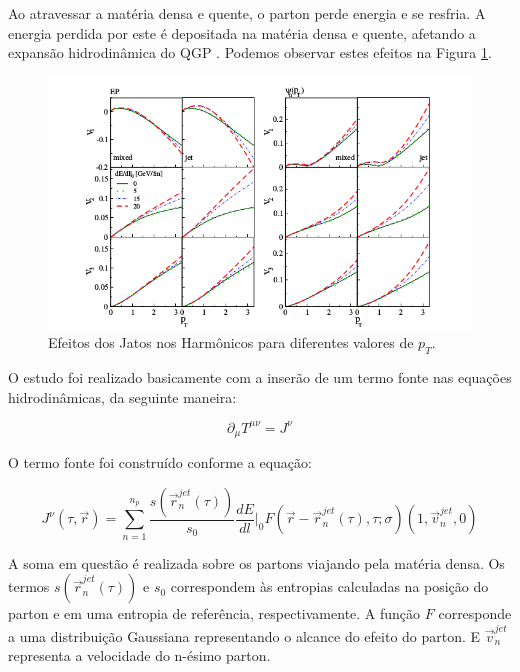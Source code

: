Ao atravessar a matéria densa e quente, o parton perde energia e se resfria. A energia perdida
por este é depositada na matéria densa e quente, afetando a expansão hidrodinâmica do QGP
\cite{andrade_jet_2014}. Podemos observar estes efeitos na Figura \ref{fig:v2}.

\begin{figure}[!htb]
\centering
 \includegraphics[scale=0.4]{Content/v2.png}
 \caption{Efeitos dos Jatos nos Harmônicos para diferentes valores de $p_{T}$.}
 \label{fig:v2}
\end{figure}

O estudo foi realizado basicamente com a inserão de um termo fonte nas equações hidrodinâmicas, da seguinte maneira:

\begin{equation}
 \partial_{\mu} T^{\mu \nu} = J^{\nu}
\end{equation}

O termo fonte foi construído conforme a equação:

\begin{equation}
 J^{\nu}(\tau,\overrightarrow{r}) = \sum_{n=1}^{n_p} \frac{s(\overrightarrow{r}^{jet}_{n}(\tau))}{s_0} \frac{dE}{dl}\bigg|_0
 F(\overrightarrow{r}-\overrightarrow{r}^{jet}_{n}(\tau),\tau;\sigma)(1,\overrightarrow{v}^{jet}_{n},0)
\end{equation}

A soma em questão é realizada sobre os partons viajando pela matéria densa. Os termos $s(\overrightarrow{r}^{jet}_{n}(\tau))$ e $s_0$
correspondem às entropias calculadas na posição do parton e em uma entropia de referência, respectivamente. A função $F$ corresponde a uma
distribuição Gaussiana representando o alcance do efeito do parton. E $\overrightarrow{v}^{jet}_{n}$ representa a velocidade do n-ésimo
parton.
